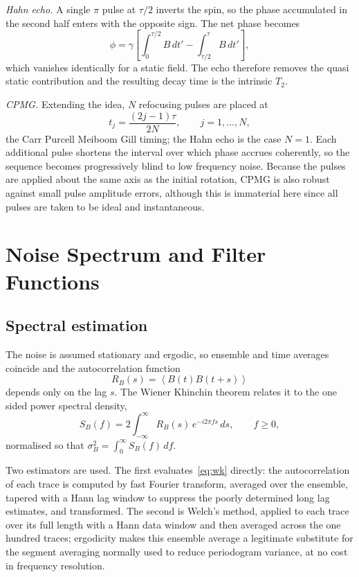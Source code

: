 \documentclass[conference]{IEEEtran}
\newcommand{\avg}[1]{\left\langle#1\right\rangle}
\begin{document}
\emph{Hahn echo.} A single $\pi$ pulse at $\tau/2$ inverts the spin, so the phase
accumulated in the second half enters with the opposite sign. The net phase
becomes
\begin{equation}
\phi = \gamma\left[\int_0^{\tau/2}\! B\,dt' - \int_{\tau/2}^{\tau}\! B\,dt'\right],
\end{equation}
which vanishes identically for a static field. The echo therefore removes the
quasi static contribution and the resulting decay time is the intrinsic $T_2$.

\emph{CPMG.} Extending the idea, $N$ refocusing pulses are placed at
\begin{equation}
t_j = \frac{(2j-1)\tau}{2N}, \qquad j=1,\dots,N ,
\end{equation}
the Carr Purcell Meiboom Gill timing; the Hahn echo is the case $N=1$. Each
additional pulse shortens the interval over which phase accrues coherently, so
the sequence becomes progressively blind to low frequency noise. Because the pulses
are applied about the same axis as the initial rotation, CPMG is also robust
against small pulse amplitude errors, although this is immaterial here since all
pulses are taken to be ideal and instantaneous.

\section{Noise Spectrum and Filter Functions}\label{sec:psd}

\subsection{Spectral estimation}

The noise is assumed stationary and ergodic, so ensemble and time averages
coincide and the autocorrelation function
\begin{equation}
R_B(s) = \avg{B(t)B(t+s)}
\end{equation}
depends only on the lag $s$. The Wiener Khinchin theorem relates it to the
one sided power spectral density,
\begin{equation}
S_B(f) = 2\int_{-\infty}^{\infty} R_B(s)\,e^{-i2\pi f s}\,ds , \qquad f \ge 0 ,
\label{eq:wk}
\end{equation}
normalised so that $\sigma_B^2 = \int_0^\infty S_B(f)\,df$.

Two estimators are used. The first evaluates~\eqref{eq:wk} directly: the
autocorrelation of each trace is computed by fast Fourier transform, averaged over
the ensemble, tapered with a Hann lag window to suppress the poorly determined
long lag estimates, and transformed. The second is Welch's method, applied to each
trace over its full length with a Hann data window and then averaged across the
one hundred traces; ergodicity makes this ensemble average a legitimate substitute
for the segment averaging normally used to reduce periodogram variance, at no cost
in frequency resolution.
\end{document}
